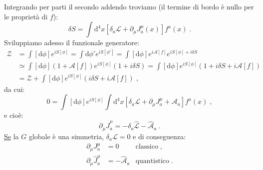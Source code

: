 \documentclass[12pt,a4paper]{article}
\theoremstyle{definition}
\newcommand{\lag}{\mathcal{L}}
\newcommand{\diff}[1][]{\mathrm{d}#1}
\newcommand{\zpart}{\mathcal{Z}}
\numberwithin{equation}{section}
\begin{document}
Integrando per parti il secondo addendo troviamo (il termine di bordo è nullo per le proprietà di $f$):
\begin{equation}
\boxed{
\delta S=\int\diff^4{x}\left[\delta_a\lag+\partial_{\mu}J^{\mu}_a(x)\right]f^a(x)
}\;.
\end{equation}
Sviluppiamo adesso il funzionale generatore:
\begin{align*}
\zpart &= \int[\diff{\phi}]e^{iS[\phi]}=\int\diff{\phi'}e^{iS[\phi']}=\int[\diff{\phi}]e^{i\mathcal{A}[f]}e^{iS[\phi]+i\delta S} \\
&\simeq \int[\diff{\phi}](1+\mathcal{A}[f])e^{iS[\phi]}(1+i\delta S)=\int[\diff{\phi}]e^{iS[\phi]}(1+i\delta S+i\mathcal{A}[f]) \\
&= \zpart+\int[\diff{\phi}]e^{iS[\phi]}(i\delta S+i\mathcal{A}[f])\;,
\end{align*}
da cui:
$$
0=\int[\diff{\phi }]e^{iS[\phi]}\int\diff^4{x}[\delta_a\lag+\partial_{\mu}J^{\mu}_a+\mathcal{A}_a]f^a(x)\;,
$$
e cioè:
\begin{equation}
\boxed{
\partial_{\mu}\hat{J}^{\mu}_a=-\delta_a\hat{\lag}-\hat{\mathcal{A}}_a
}\;.
\end{equation}
\underline{Se} la $G$ globale è una simmetria, $\delta_a\lag=0$ e di conseguenza:
\begin{align*}
\partial_{\mu}J^{\mu}_a&=0 &\mbox{classico}\;, \\
\partial_{\mu}\hat{J}^{\mu}_a &= -\hat{\mathcal{A}}_a & \mbox{quantistico}\;.
\end{align*}
\end{document}
